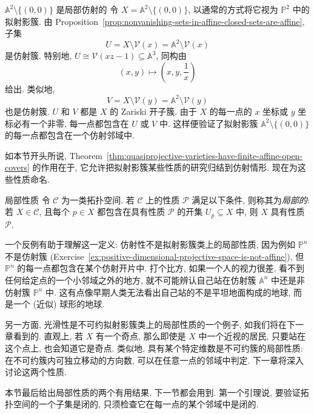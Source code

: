 \begin{Example}{$\mathbb{A}^{2}\setminus\{(0,0)\}$ 是局部仿射的}\leavevmode\label{ex:punctured-affine-plane-has-affine-open-cover}
令 $X=\mathbb{A}^{2}\setminus\{(0,0)\}$, 以通常的方式将它视为 $\mathbb{P}^{2}$ 中的拟射影簇. 由 Proposition~\ref{prop:nonvanishing-sets-in-affine-closed-sets-are-affine}, 子集
\[
  U=X\setminus\mathcal{V}(x)=\mathbb{A}^{2}\setminus\mathcal{V}(x)
\]
是仿射簇. 特别地, $U\cong\mathcal{V}(xz-1)\subseteq\mathbb{A}^{3}$, 同构由
\[
  (x,y)\mapsto\left(x,y,\frac{1}{x}\right)
\]
给出. 类似地,
\[
  V=X\setminus\mathcal{V}(y)=\mathbb{A}^{2}\setminus\mathcal{V}(y)
\]
也是仿射簇. $U$ 和 $V$ 都是 $X$ 的 Zariski 开子簇. 由于 $X$ 的每一点的 $x$ 坐标或 $y$ 坐标必有一个非零, 每一点都包含在 $U$ 或 $V$ 中. 这样便验证了拟射影簇 $\mathbb{A}^{2}\setminus\{(0,0)\}$ 的每一点都包含在一个仿射邻域中.
\end{Example}

如本节开头所说, Theorem~\ref{thm:quasiprojective-varieties-have-finite-affine-open-covers} 的作用在于, 它允许把拟射影簇某些性质的研究归结到仿射情形. 现在为这些性质命名.

\begin{Definition}{局部性质}\leavevmode\label{def:local-property-of-topological-spaces}
令 $\mathcal{C}$ 为一类拓扑空间. 若 $\mathcal{C}$ 上的性质 $\mathcal{P}$ 满足以下条件, 则称其为\emph{局部的}: 若 $X\in\mathcal{C}$, 且每个 $p\in X$ 都包含在具有性质 $\mathcal{P}$ 的开集 $U_{p}\subseteq X$ 中, 则 $X$ 具有性质 $\mathcal{P}$.
\end{Definition}

一个反例有助于理解这一定义: 仿射性不是拟射影簇类上的局部性质, 因为例如 $\mathbb{P}^{n}$ 不是仿射簇 (Exercise~\ref{ex:positive-dimensional-projective-space-is-not-affine}), 但 $\mathbb{P}^{n}$ 的每一点都包含在某个仿射开片中. 打个比方, 如果一个人的视力很差, 看不到任何给定点的一个小邻域之外的地方, 就不可能辨认自己站在仿射簇 $\mathbb{A}^{n}$ 中还是非仿射簇 $\mathbb{P}^{n}$ 中. 这有点像早期人类无法看出自己站的不是平坦地面构成的地球, 而是一个 (近似) 球形的地球.

另一方面, 光滑性是不可约拟射影簇类上的局部性质的一个例子, 如我们将在下一章看到的. 直观上, 若 $X$ 有一个奇点, 那么即使是 $X$ 中一个近视的居民, 只要站在这个点上, 也会知道它是奇点. 类似地, 具有某个特定维数是不可约簇的局部性质: 在不可约簇内可独立移动的方向数, 可以在任意一点的邻域中判定. 下一章将深入讨论这两个性质.

本节最后给出局部性质的两个有用结果, 下一节都会用到. 第一个引理说, 要验证拓扑空间的一个子集是闭的, 只须检查它在每一点的某个邻域中是闭的.

